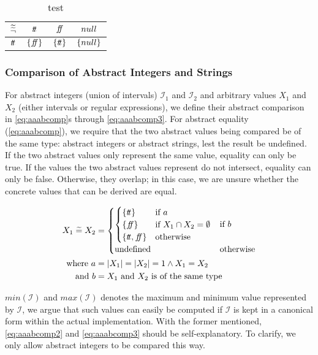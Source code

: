 \begin{table}[H]
    \centering
    \caption{test}
    \begin{tabular}{c|ccc}
        $\widetilde{\widetilde{\neg}}$ & $t\!t$ & $f\!\!f$ & $null$ \\
        \hline
        $t\!t$ & $\{f\!\!f\}$ & $\{t\!t\}$ & $\{null\}$ \\
    \end{tabular}
    \label{tab:aaabneg}
\end{table}

\subsubsection{Comparison of Abstract Integers and Strings}\label{subsubsec:abstract-comparison}
For abstract integers (union of intervals) $\mathscr{I}_1$ and $\mathscr{I}_2$ and arbitrary values $X_1$ and $X_2$ (either intervals or regular expressions), we define their abstract comparison in \autoref{eq:aaabcomp}s through \ref{eq:aaabcomp3}.
For abstract equality (\autoref{eq:aaabcomp}), we require that the two abstract values being compared be of the same type: abstract integers or abstract strings, lest the result be undefined.
If the two abstract values only represent the same value, equality can only be true.
If the values the two abstract values represent do not intersect, equality can only be false.
Otherwise, they overlap; in this case, we are unsure whether the concrete values that can be derived are equal.

\begin{align} \nonumber
    X_1 \;\aab{=}\; X_2 &= \begin{cases}
        \begin{cases}
        \{\true\} & \text{if } a\\
        \{\false\} & \text{if } X_1 \cap X_2 = \emptyset \\
        \{\true, \false\} & \text{otherwise }
        \end{cases} & \text{if $b$} \\
        \text{undefined} & \text{otherwise}
    \end{cases}\\
    \text{where } a&=|X_1| = |X_2| = 1 \land X_1 = X_2 \nonumber\\
    \text{and } b&=X_1 \text{ and } X_2 \text{ is of the same type}
    \label{eq:aaabcomp}
\end{align}

$min(\mathscr{I})$ and $max(\mathscr{I})$ denotes the maximum and minimum value represented by $\mathscr{I}$, we argue that such values can easily be computed if $\mathscr{I}$ is kept in a canonical form within the actual implementation.
With the former mentioned, \autoref{eq:aaabcomp2} and \ref{eq:aaabcomp3} should be self-explanatory.
To clarify, we only allow abstract integers to be compared this way.

